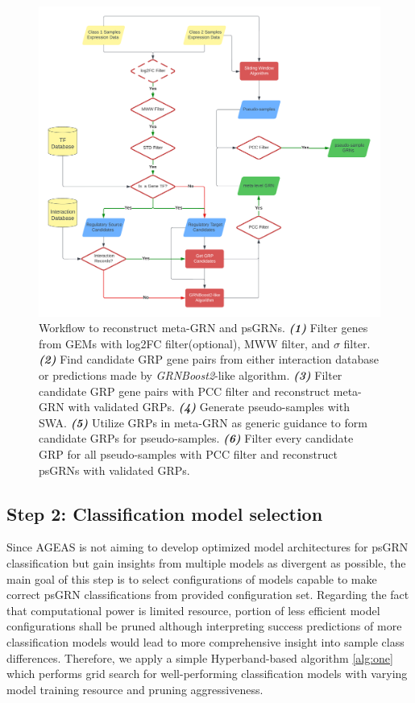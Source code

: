 \documentclass[fleqn,10pt]{wlscirep}
\begin{document}
    \begin{figure}[ht]
      \centering
      \includegraphics[width=0.8\linewidth, keepaspectratio,]{../images/data_preprocess_trans.png}
      \caption{
        Workflow to reconstruct meta-GRN and psGRNs.
        \textbf{\emph{(1)}} Filter genes from GEMs with log2FC filter(optional), MWW filter, and $\sigma$ filter.
        \textbf{\emph{(2)}} Find candidate GRP gene pairs from either interaction database or predictions made by \emph{GRNBoost2}\cite{grnboost2}-like algorithm.
        \textbf{\emph{(3)}} Filter candidate GRP gene pairs with PCC filter and reconstruct meta-GRN with validated GRPs.
        \textbf{\emph{(4)}} Generate pseudo-samples with SWA.
        \textbf{\emph{(5)}} Utilize GRPs in meta-GRN as generic guidance to form candidate GRPs for pseudo-samples.
        \textbf{\emph{(6)}} Filter every candidate GRP for all pseudo-samples with PCC filter and reconstruct psGRNs with validated GRPs.
      }
      \label{data_preprocess}
    \end{figure}

  \subsection*{Step 2: Classification model selection}
    \label{step2}
    Since AGEAS is not aiming to develop optimized model architectures for psGRN classification but gain insights from multiple models as divergent as possible, the main goal of this step is to select configurations of models capable to make correct psGRN classifications from provided configuration set.
    Regarding the fact that computational power is limited resource, portion of less efficient model configurations shall be pruned although interpreting success predictions of more classification models would lead to more comprehensive insight into sample class differences.
    Therefore, we apply a simple Hyperband\cite{hyperband}-based algorithm \ref{alg:one} which performs grid search for well-performing classification models with varying model training resource and pruning aggressiveness.
\end{document}
